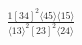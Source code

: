 \documentclass[varwidth, border=5pt]{standalone}
\begin{document}
\begin{my}
$\begin{gathered}
\scriptscriptstyle\frac{1[34]^2⟨45⟩⟨15⟩}{⟨13⟩^2[23]^2⟨24⟩}
\end{gathered}$
\end{my}
\end{document}
